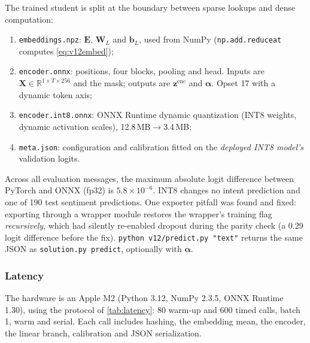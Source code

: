 \documentclass[11pt,a4paper]{article}
\theoremstyle{remark}
\newcommand{\R}{\mathbb{R}}
\newcommand{\W}{\bm{W}}
\newcommand{\bb}{\bm{b}}
\newcommand{\z}{\bm{z}}
\begin{document}
The trained student is split at the boundary between sparse lookups and dense computation:
\begin{enumerate}
  \item \texttt{embeddings.npz}: $\bm E$, $\W_L$ and $\bb_L$, used from NumPy (\texttt{np.add.reduceat} computes \cref{eq:v12embed});
  \item \texttt{encoder.onnx}: positions, four blocks, pooling and head. Inputs are $\bm X\in\R^{1\times T\times256}$ and the mask; outputs are $\z^{\text{enc}}$ and $\bm\alpha$. Opset 17 with a dynamic token axis;
  \item \texttt{encoder.int8.onnx}: ONNX Runtime dynamic quantization (INT8 weights, dynamic activation scales), 12.8\,MB$\to$3.4\,MB;
  \item \texttt{meta.json}: configuration and calibration fitted on the \emph{deployed INT8 model's} validation logits.
\end{enumerate}
Across all evaluation messages, the maximum absolute logit difference between PyTorch and ONNX (fp32) is $5.8\times10^{-6}$. INT8 changes no intent prediction and one of 190 test sentiment predictions. One exporter pitfall was found and fixed: exporting through a wrapper module restores the wrapper's training flag \emph{recursively}, which had silently re-enabled dropout during the parity check (a 0.29 logit difference before the fix). \texttt{python v12/predict.py "text"} returns the same JSON as \texttt{solution.py predict}, optionally with $\bm\alpha$.

\subsubsection{Latency}
The hardware is an Apple M2 (Python 3.12, NumPy 2.3.5, ONNX Runtime 1.30), using the protocol of \cref{tab:latency}: 80 warm-up and 600 timed calls, batch 1, warm and serial. Each call includes hashing, the embedding mean, the encoder, the linear branch, calibration and JSON serialization.
\end{document}
